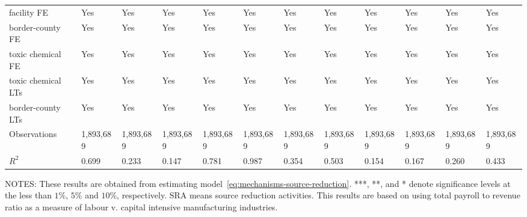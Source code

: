 \begin{table}[H]
{\begin{tabular}{@{}llllllllllll@{}}
            facility FE           & Yes       & Yes       & Yes             & Yes        & Yes                   & Yes       & Yes       & Yes                   & Yes                 & Yes                   & Yes                 \\
            border-county FE      & Yes       & Yes       & Yes             & Yes        & Yes                   & Yes       & Yes       & Yes                   & Yes                 & Yes                   & Yes                 \\
            toxic chemical FE     & Yes       & Yes       & Yes             & Yes        & Yes                   & Yes       & Yes       & Yes                   & Yes                 & Yes                   & Yes                 \\
            toxic chemical LTs    & Yes       & Yes       & Yes             & Yes        & Yes                   & Yes       & Yes       & Yes                   & Yes                 & Yes                   & Yes                 \\
            border-county LTs     & Yes       & Yes       & Yes             & Yes        & Yes                   & Yes       & Yes       & Yes                   & Yes                 & Yes                   & Yes                 \\\midrule
            Observations          & 1,893,689 & 1,893,689 & 1,893,689       & 1,893,689  & 1,893,689             & 1,893,689 & 1,893,689 & 1,893,689             & 1,893,689           & 1,893,689             & 1,893,689           \\
            $R^2$                 & 0.699     & 0.233     & 0.147           & 0.781      & 0.987                 & 0.354     & 0.503     & 0.154                 & 0.167               & 0.260                 & 0.433               \\ \bottomrule\bottomrule
        \end{tabular}%
    }
    \begin{minipage}{\columnwidth}
        \vspace{0.05in}
        \tiny NOTES: These results are obtained from estimating model~\ref{eq:mechanisms-source-reduction}. ***, **, and * denote significance levels at the less than $1\%$, $5\%$ and $10\%$, respectively. SRA means source reduction activities. This results are based on using total payroll to revenue ratio as a measure of labour v. capital intensive manufacturing industries.
    \end{minipage}
\end{table}